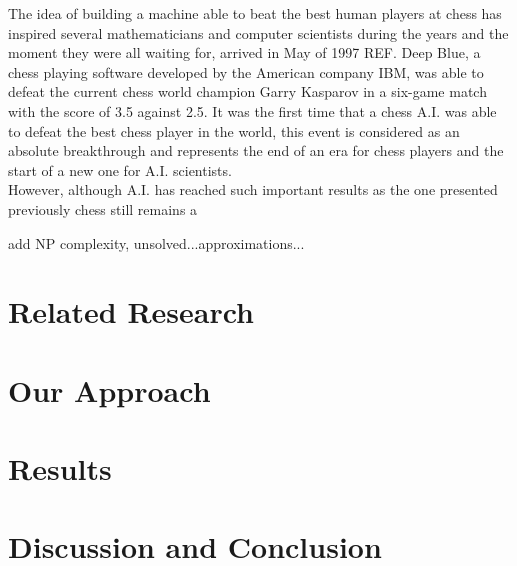 \documentclass{article}
\begin{document}
The idea of building a machine able to beat the best human players at chess has inspired several mathematicians and computer scientists during the years and the moment they were all waiting for, arrived in May of 1997 REF. Deep Blue, a chess playing software developed by the American company IBM, was able to defeat the current chess world champion Garry Kasparov in a six-game match with the score of 3.5 against 2.5. It was the first time that a chess A.I. was able to defeat the best chess player in the world, this event is considered as an absolute breakthrough and represents the end of an era for chess players and the start of a new one for A.I. scientists.\\
However, although A.I. has reached such important results as the one presented previously chess still remains a      

add NP complexity, unsolved...approximations...
            


\section{Related Research}


\section{Our Approach}


\section{Results}


\section{Discussion and Conclusion}





\end{document}
